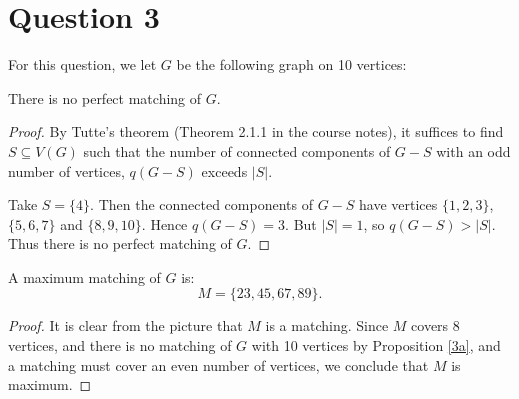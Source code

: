 \documentclass{unswmaths}
\begin{document}
\section*{Question 3}
For this question, we let $G$ be the following graph on 10 vertices:
\begin{center}
\end{center}
\begin{proposition}[Part (a)]
\label{3a}
    There is no perfect matching of $G$.
\end{proposition}
\begin{proof}
    By Tutte's theorem (Theorem 2.1.1 in the course notes), it suffices to find
    $S \subseteq V(G)$ such that the number of connected components of $G-S$ with
    an odd number of vertices, $q(G-S)$
    exceeds $|S|$.
    
    Take $S = \{4\}$. Then the connected components of $G-S$ have vertices $\{1,2,3\}$,
    $\{5,6,7\}$ and $\{8,9,10\}$. Hence $q(G-S) = 3$. But $|S| = 1$, so $q(G-S) > |S|$.
    Thus there is no perfect matching of $G$.
\end{proof}
\begin{proposition}[Part (b)]
\label{3b}
    A maximum matching of $G$ is:
    \begin{equation}
        M = \{ 23,45,67,89\}.
    \end{equation}
\end{proposition}
\begin{proof}
    It is clear from the picture that $M$ is a matching. Since $M$ covers $8$
    vertices, and there is no matching of $G$ with 10 vertices by Proposition \ref{3a}, 
    and a matching must cover an even number of vertices, we conclude that 
    $M$ is maximum.
\end{proof} 
\end{document}
